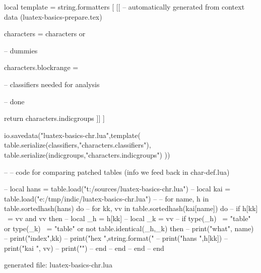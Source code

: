 local template = string.formatters [ [[
-- automatically generated from context data (luatex-basics-prepare.tex)

characters = characters or { }

-- dummies

characters.blockrange = { }

-- classifiers needed for analysis



-- done

return characters.indicgroups
]] ]

io.savedata("luatex-basics-chr.lua",template(
    table.serialize(classifiers,"characters.classifiers"),
    table.serialize(indicgroups,"characters.indicgroups")
))


-- -- code for comparing patched tables (info we feed back in char-def.lua)

-- local hans = table.load("t:/sources/luatex-basics-chr.lua")
-- local kai  = table.load("e:/tmp/indic/luatex-basics-chr.lua")
--
-- for name, h in table.sortedhash(hans) do
--     for kk, vv in table.sortedhash(kai[name]) do
--         if h[kk] ~= vv and vv then
--             local _h = h[kk]
--             local _k = vv
--             if type(_h) ~= "table" or type(_k) ~= "table" or not table.identical(_h,_k) then
--                 print("what", name)
--                 print("index",kk)
--                 print("hex  ",string.format("%
--                 print("hans ",h[kk])
--                 print("kai  ", vv)
--                 print("")
--             end
--         end
--     end
-- end

\stopluacode



\startTEXpage[offset=10pt]
    \tttf generated file: luatex-basics-chr.lua
\stopTEXpage
